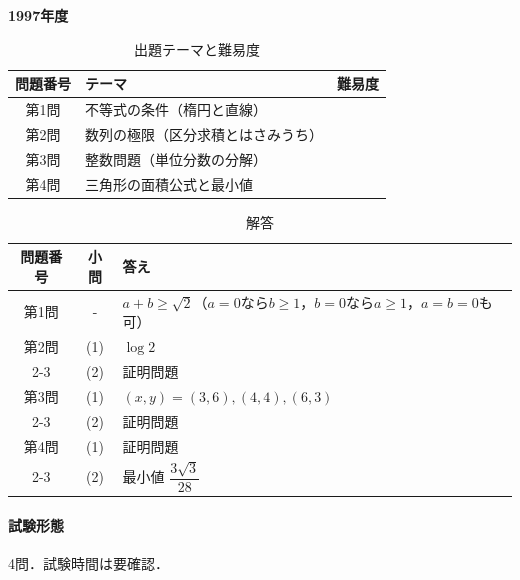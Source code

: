 \documentclass[../../main.tex]{subfiles}
\begin{document}
\begin{center}
  {\fontsize{48pt}{58pt}\selectfont \textbf{1997}\normalsize\textbf{年度}}
\end{center}

\begin{table}[htb]
  \centering
  \caption{出題テーマと難易度}
  \begin{tabular}{|c|p{9cm}|c|}
    \hline
    \textbf{問題番号} & \textbf{テーマ} & \textbf{難易度} \\
    \hline
    第1問 & 不等式の条件（楕円と直線） & \\
    \hline
    第2問 & 数列の極限（区分求積とはさみうち） & \\
    \hline
    第3問 & 整数問題（単位分数の分解） & \\
    \hline
    第4問 & 三角形の面積公式と最小値 & \\
    \hline
  \end{tabular}
\end{table}

\begin{table}[htb]
  \centering
  \caption{解答}
  \renewcommand{\arraystretch}{1.4}
  \begin{tabular}{|c|c|p{9cm}|}
    \hline
    \textbf{問題番号} & \textbf{小問} & \textbf{答え} \\
    \hline
    第1問 & - & $a+b\ge\sqrt{2}$（$a=0$なら$b\ge1$，$b=0$なら$a\ge1$，$a=b=0$も可） \\
    \hline
    第2問 & (1) & $\log 2$ \\
    \cline{2-3}
    & (2) & 証明問題 \\
    \hline
    第3問 & (1) & $(x,y)=(3,6),(4,4),(6,3)$ \\
    \cline{2-3}
    & (2) & 証明問題 \\
    \hline
    第4問 & (1) & 証明問題 \\
    \cline{2-3}
    & (2) & 最小値 $\dfrac{3\sqrt{3}}{28}$ \\
    \hline
  \end{tabular}
\end{table}

\paragraph{試験形態}
4問．試験時間は要確認．
\end{document}
